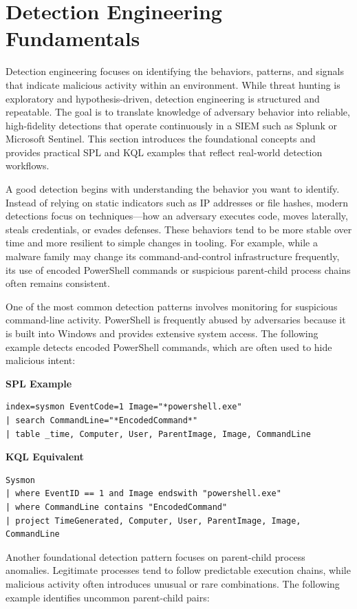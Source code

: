 \section{Detection Engineering Fundamentals}

Detection engineering focuses on identifying the behaviors, patterns, and signals that indicate malicious 
activity within an environment. While threat hunting is exploratory and hypothesis-driven, detection engineering 
is structured and repeatable. The goal is to translate knowledge of adversary behavior into reliable, high-fidelity 
detections that operate continuously in a SIEM such as Splunk or Microsoft Sentinel. This section introduces the 
foundational concepts and provides practical SPL and KQL examples that reflect real-world detection workflows.

A good detection begins with understanding the behavior you want to identify. Instead of relying on static indicators 
such as IP addresses or file hashes, modern detections focus on techniques—how an adversary executes code, moves laterally, 
steals credentials, or evades defenses. These behaviors tend to be more stable over time and more resilient to simple 
changes in tooling. For example, while a malware family may change its command-and-control infrastructure frequently, 
its use of encoded PowerShell commands or suspicious parent-child process chains often remains consistent.

One of the most common detection patterns involves monitoring for suspicious command-line activity. PowerShell is frequently 
abused by adversaries because it is built into Windows and provides extensive system access. The following example detects 
encoded PowerShell commands, which are often used to hide malicious intent:

\textbf{SPL Example}
\begin{lstlisting}
index=sysmon EventCode=1 Image="*powershell.exe"
| search CommandLine="*EncodedCommand*"
| table _time, Computer, User, ParentImage, Image, CommandLine
\end{lstlisting}

\textbf{KQL Equivalent}
\begin{lstlisting}
Sysmon
| where EventID == 1 and Image endswith "powershell.exe"
| where CommandLine contains "EncodedCommand"
| project TimeGenerated, Computer, User, ParentImage, Image, CommandLine
\end{lstlisting}

Another foundational detection pattern focuses on parent-child process anomalies. Legitimate processes tend to follow 
predictable execution chains, while malicious activity often introduces unusual or rare combinations. The following 
example identifies uncommon parent-child pairs:


